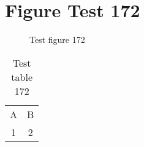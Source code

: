 \documentclass{article}
\begin{document}
\section{Figure Test 172}
\begin{figure}[h]
\caption{Test figure 172}
\end{figure}
\begin{table}[h]
\caption{Test table 172}
\begin{tabular}{cc}
A & B \\
1 & 2
\end{tabular}
\end{table}
\end{document}
